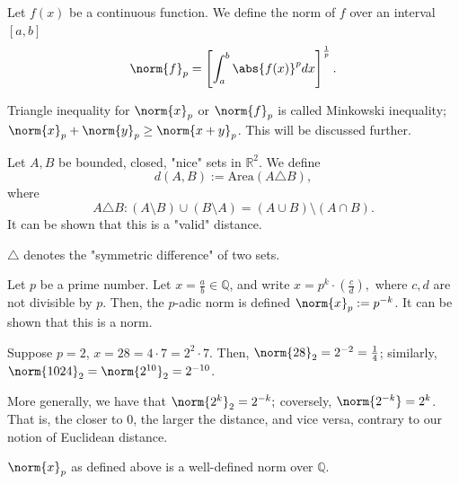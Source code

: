 \begin{example}
    Let $f(x)$ be a continuous function. We define the norm of $f$ over an interval $[a, b]$
    $$
    \norm{f}_p = \left[\int_{a}^{b}\abs{f(x)}^p dx \right]^{\frac{1}{p}}.
    $$
\end{example}

\begin{remark}
    Triangle inequality for $\norm{x}_p$ or $\norm{f}_p$ is called Minkowski inequality; $\norm{x}_p + \norm{y}_p \geq \norm{x + y}_p$. This will be discussed further.
\end{remark}

\begin{example}
    Let $A, B$ be bounded, closed, "nice" sets in $\mathbb{R}^2$. We define \[
        d(A, B) := \text{Area}(A \triangle B),
        \]
        where $$A \triangle B : (A \setminus B) \cup (B \setminus A) = (A \cup B) \setminus (A \cap B).$$ It can be shown that this is a "valid" distance.
\end{example}

\begin{remark}
    $\triangle$ denotes the "symmetric difference" of two sets.
\end{remark}


\begin{example}
    Let $p$ be a prime number. Let $x = \frac{a}{b} \in \mathbb{Q}$, and write $x = p^k\cdot \left(\frac{c}{d}\right),$ where $c, d$ are not divisible by $p$. Then, the $p$-adic norm is defined $\norm{x}_p := p^{-k}$. It can be shown that this is a norm. 

    Suppose $p = 2$, $x = 28 = 4 \cdot 7 = 2^2 \cdot 7$. Then, $\norm{28}_2 = 2^{-2} = \frac{1}{4}$; similarly, $\norm{1024}_2 = \norm{2^{10}}_2 = 2^{-10}$.

    More generally, we have that $\norm{2^k}_2 = 2^{-k};$ coversely, $\norm{2^{-k}} = 2^k$. That is, the closer to $0$, the larger the distance, and vice versa, contrary to our notion of Euclidean distance.
\end{example}

\begin{proposition}
    $\norm{x}_p$ as defined above is a well-defined norm over $\mathbb{Q}$.
\end{proposition}

